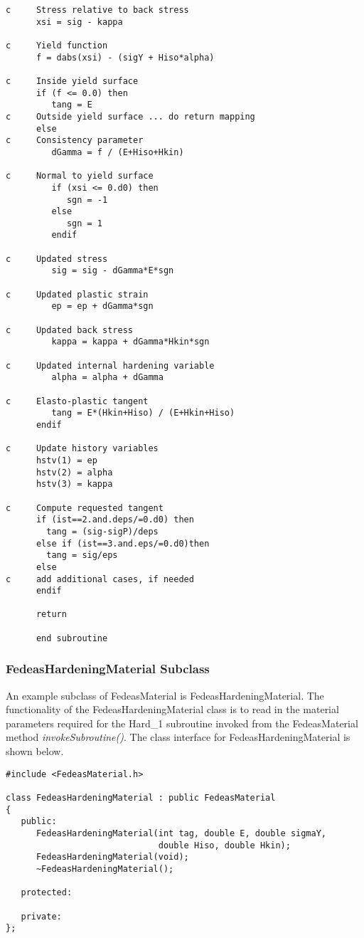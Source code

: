 \documentclass[12pt]{article}
\begin{document}
{\begin{verbatim}
c     Stress relative to back stress
      xsi = sig - kappa

c     Yield function
      f = dabs(xsi) - (sigY + Hiso*alpha)

c     Inside yield surface
      if (f <= 0.0) then
         tang = E
c     Outside yield surface ... do return mapping
      else
c     Consistency parameter
         dGamma = f / (E+Hiso+Hkin)

c     Normal to yield surface
         if (xsi <= 0.d0) then
            sgn = -1
         else
            sgn = 1
         endif

c     Updated stress
         sig = sig - dGamma*E*sgn
	
c     Updated plastic strain
         ep = ep + dGamma*sgn

c     Updated back stress
         kappa = kappa + dGamma*Hkin*sgn
	
c     Updated internal hardening variable
         alpha = alpha + dGamma

c     Elasto-plastic tangent
         tang = E*(Hkin+Hiso) / (E+Hkin+Hiso)
      endif

c     Update history variables
      hstv(1) = ep
      hstv(2) = alpha
      hstv(3) = kappa

c     Compute requested tangent
      if (ist==2.and.deps/=0.d0) then
      	tang = (sig-sigP)/deps
      else if (ist==3.and.eps/=0.d0)then
      	tang = sig/eps
      else
c     add additional cases, if needed
      endif	         

      return

      end subroutine 
\end{verbatim}
}

\subsubsection{FedeasHardeningMaterial Subclass}
An example subclass of FedeasMaterial is FedeasHardeningMaterial. The functionality
of the FedeasHardeningMaterial class is to read in the material parameters required
for the Hard\_1 subroutine invoked from the FedeasMaterial method {\em invokeSubroutine()}.
The class interface for FedeasHardeningMaterial is shown below.

{\sf\small
\begin{verbatim}
#include <FedeasMaterial.h>

class FedeasHardeningMaterial : public FedeasMaterial
{
   public:
      FedeasHardeningMaterial(int tag, double E, double sigmaY,
                              double Hiso, double Hkin);
      FedeasHardeningMaterial(void);
      ~FedeasHardeningMaterial();

   protected:

   private:
};
\end{verbatim}
}
\end{document}
